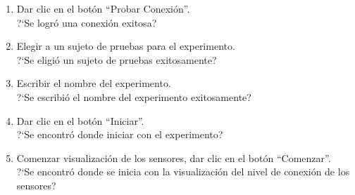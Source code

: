 \begin{enumerate}
\begin{todolist}
	\end{todolist}
	\item {Dar clic en el botón ``Probar Conexión''.\\
			?`Se logró una conexión exitosa?
	}
	\item {Elegir a un sujeto de pruebas para el experimento.\\
			?`Se eligió un sujeto de pruebas exitosamente?
	}
	\item {Escribir el nombre del experimento.\\
			?`Se escribió el nombre del experimento exitosamente?
	}
	\item {Dar clic en el botón ``Iniciar''.\\
			?`Se encontró donde iniciar con el experimento?
	}
	\item {Comenzar visualización de los sensores, dar clic en el botón ``Comenzar''.\\
			?`Se encontró donde se inicia con la visualización del nivel de conexión de los sensores?
	}

\end{enumerate}
